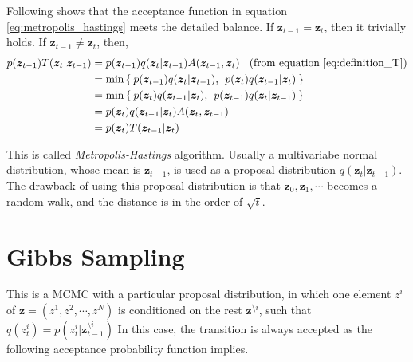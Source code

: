 \documentclass[a4]{article}
\begin{document}
Following shows that the acceptance function in equation \ref{eq:metropolis_hastings} meets the detailed balance.
If $\bm{z}_{t-1} = \bm{z}_t$, then it trivially holds.
If $\bm{z}_{t-1} \ne \bm{z}_t$, then,
\begin{equation}
\begin{aligned}
p(\bm{z}_{t-1})T(\bm{z}_{t}|\bm{z}_{t-1}) &= p(\bm{z}_{t-1})q(\bm{z}_{t}|\bm{z}_{t-1})A(\bm{z}_{t-1}, \bm{z}_{t})
\:\:\:\:\text{(from equation \ref{eq:definition_T})}\\
&= \min\left\{\:p(\bm{z}_{t-1})q(\bm{z}_{t}|\bm{z}_{t-1}),\:\: p(\bm{z}_{t})q(\bm{z}_{t-1}|\bm{z}_{t})\:\right\}\\
&= \min\left\{\:p(\bm{z}_{t})q(\bm{z}_{t-1}|\bm{z}_{t}),\:\: p(\bm{z}_{t-1})q(\bm{z}_{t}|\bm{z}_{t-1})\:\right\}\\
&= p(\bm{z}_{t})q(\bm{z}_{t-1}|\bm{z}_{t})A(\bm{z}_{t}, \bm{z}_{t-1})\\
&= p(\bm{z}_{t})T(\bm{z}_{t-1}|\bm{z}_{t})\\
\end{aligned}
\end{equation}

This is called \textit{Metropolis-Hastings} algorithm. Usually a multivariabe normal distribution, whose mean
is $\bm{z}_{t-1}$, is used as a proposal distribution $q(\bm{z}_{t}|\bm{z}_{t-1})$.
The drawback of using this proposal distribution is that $\bm{z}_0, \bm{z}_1, \cdots$ becomes a random walk, and
the distance is in the order of $\sqrt{t}$.

\section{Gibbs Sampling}
This is a MCMC with a particular proposal distribution,
in which one element $z^i$ of $\bm{z} = (z^1, z^2, \cdots, z^N)$ is conditioned on the rest $\bm{z}^{\setminus i}$,
such that $q(z^i_{t}) = p(z^i_{t}|\bm{z}^{\setminus i}_{t-1})$
In this case, the transition is always accepted as the following acceptance probability function 
implies.
\end{document}
